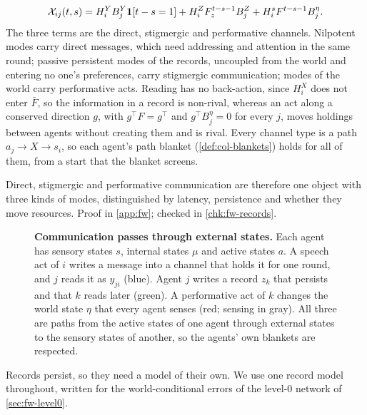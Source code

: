 \begin{proposition}\label{prop:fw-transfer-kernel}
\begin{equation}\label{eq:fw-kernel}
\mathcal X_{ij}(t,s)=H^Y_iB^Y_j\mathbf{1}[t-s=1]+H^Z_iF_z^{t-s-1}B^Z_j+H^s_iF^{t-s-1}B^\eta_j.
\end{equation}
The three terms are the direct, stigmergic and performative channels. Nilpotent modes carry direct messages, which need addressing and attention in the same round; passive persistent modes of the records, uncoupled from the world and entering no one's preferences, carry stigmergic communication; modes of the world carry performative acts. Reading has no back-action, since $H^X_i$ does not enter $\bar F$, so the information in a record is non-rival, whereas an act along a conserved direction $g$, with $g^\top F=g^\top$ and $g^\top B^\eta_j=0$ for every $j$, moves holdings between agents without creating them and is rival. Every channel type is a path $a_j\to X\to s_i$, so each agent's path blanket (\cref{def:col-blankets}) holds for all of them, from a start that the blanket screens.
\end{proposition}

Direct, stigmergic and performative communication are therefore one object with three kinds of modes, distinguished by latency, persistence and whether they move resources. Proof in \cref{app:fw}; checked in \cref{chk:fw-records}.

\begin{figure}[t]
  \centering
  \resizebox{\textwidth}{!}{}
  \caption{\textbf{Communication passes through external states.} Each agent has sensory states $s$, internal states $\mu$ and active states $a$. A speech act of $i$ writes a message into a channel that holds it for one round, and $j$ reads it as $y_{ji}$ (blue). Agent $j$ writes a record $z_k$ that persists and that $k$ reads later (green). A performative act of $k$ changes the world state $\eta$ that every agent senses (red; sensing in gray). All three are paths from the active states of one agent through external states to the sensory states of another, so the agents' own blankets are respected.}
  \label{fig:fw-channels}
\end{figure}

Records persist, so they need a model of their own. We use one record model throughout, written for the world-conditional errors of the level-0 network of \cref{sec:fw-level0}.

